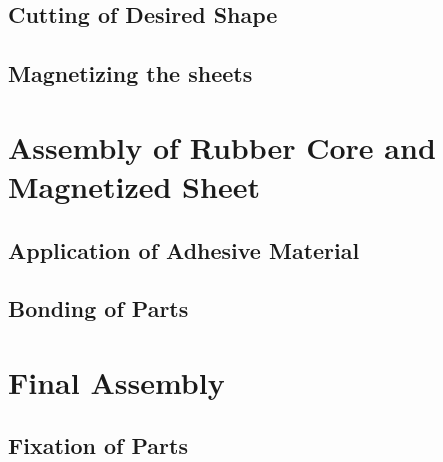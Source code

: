 \documentclass[12pt,a4paper,oneside]{article}
\begin{document}
\subsection{Cutting of Desired Shape}
\subsection{Magnetizing the sheets}

\newpage


\section{Assembly of Rubber Core and Magnetized Sheet}
\subsection{Application of Adhesive Material}
\subsection{Bonding of Parts}


\section{Final Assembly}
\subsection{Fixation of Parts}

\clearpage
{}
\printbibliography
\end{document}
